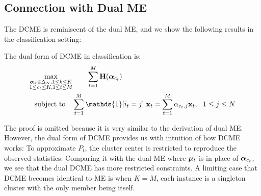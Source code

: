 \subsection{Connection with Dual ME}

The DCME is reminiscent of the dual ME, and we show the following results in the
classification setting:

\begin{thm} The dual form of DCME in classification is:
  \begin{align}
    \max\limits_{\substack{\valpha_k \in \Delta_N ,  1 \le k \le K \\
                           1 \le c_t \le K , 1 \le t \le M}}
                 &\qquad
    \sum\limits_{t=1}^M \entropy(\valpha_{c_t}) \label{eq::dual_dcme_op} \\
    \subjto \quad
    & \sum\limits_{t = 1}^M \mathds{1}[i_t = j]\; \vx_t =
    \sum\limits_{t = 1}^M \alpha_{c_t, j} \vx_t,~~ 1 \le j \le N \nonumber
  \end{align}
\end{thm}

The proof is omitted because it is very similar to the derivation of dual ME.
However, the dual form of DCME provides us with intuition of how DCME works: To
approximate $P_t$, the cluster center is restricted to reproduce the observed
statistics. Comparing it with the dual ME where $\boldsymbol{\mu}_t$ is in place of
$\boldsymbol{\alpha}_{c_t}$, we see that the dual DCME has more restricted constraints. A
limiting case that DCME becomes identical to ME is when $K=M$, \ie{} each
instance is a singleton cluster with the only member being itself.
